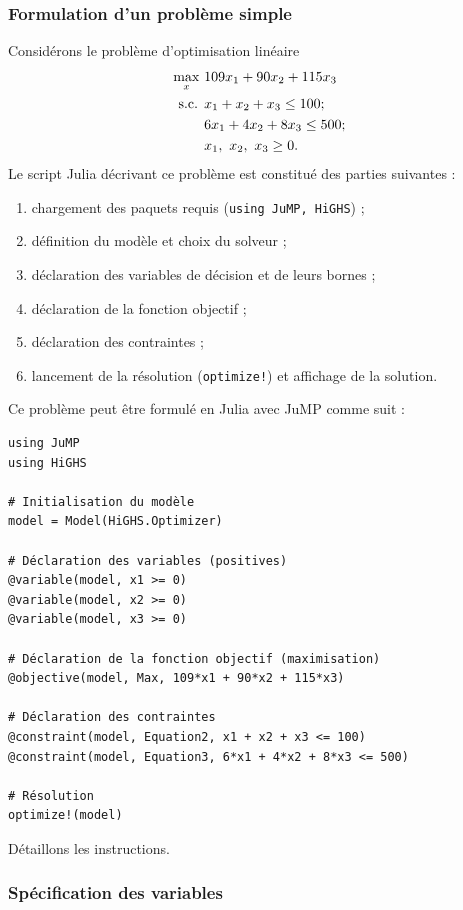 \subsubsection{Formulation d'un problème simple}

\begin{example}
\label{jump_simple}
Considérons le problème d'optimisation linéaire
\begin{align*}
\max_x \ & 109 x_1 + 90 x_2 + 115 x_3 \\
\mbox{s.c. } & x_1 + x_2 + x_3 \leq 100; \\
& 6x_1 + 4x_2 + 8x_3 \leq 500; \\
& x_1,\ x_2,\ x_3 \geq 0.
\end{align*}
Le script Julia décrivant ce problème est constitué des parties suivantes :
\begin{enumerate}
\item
chargement des paquets requis (\verb|using JuMP, HiGHS|) ;
\item
définition du modèle et choix du solveur ;
\item
déclaration des variables de décision et de leurs bornes ;
\item
déclaration de la fonction objectif ;
\item
déclaration des contraintes ;
\item
lancement de la résolution (\verb|optimize!|) et affichage de la solution.
\end{enumerate}
Ce problème peut être formulé en Julia avec JuMP comme suit :
\begin{verbatim}
using JuMP
using HiGHS

# Initialisation du modèle
model = Model(HiGHS.Optimizer)

# Déclaration des variables (positives)
@variable(model, x1 >= 0)
@variable(model, x2 >= 0)
@variable(model, x3 >= 0)

# Déclaration de la fonction objectif (maximisation)
@objective(model, Max, 109*x1 + 90*x2 + 115*x3)

# Déclaration des contraintes
@constraint(model, Equation2, x1 + x2 + x3 <= 100)
@constraint(model, Equation3, 6*x1 + 4*x2 + 8*x3 <= 500)

# Résolution
optimize!(model)
\end{verbatim}
Détaillons les instructions.
\end{example}

\subsubsection{Spécification des variables}

